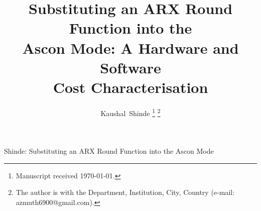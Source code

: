 \documentclass[journal,10pt]{IEEEtran}
\begin{document}
\title{Substituting an ARX Round Function into the\\ Ascon Mode: A Hardware and Software\\ Cost Characterisation}

\author{Kaushal~Shinde%
\thanks{Manuscript received \today.}%
\thanks{The author is with the Department, Institution, City, Country
(e-mail: azmuth6900@gmail.com).}}

%
{Shinde: Substituting an ARX Round Function into the Ascon Mode}

\maketitle

\end{document}
